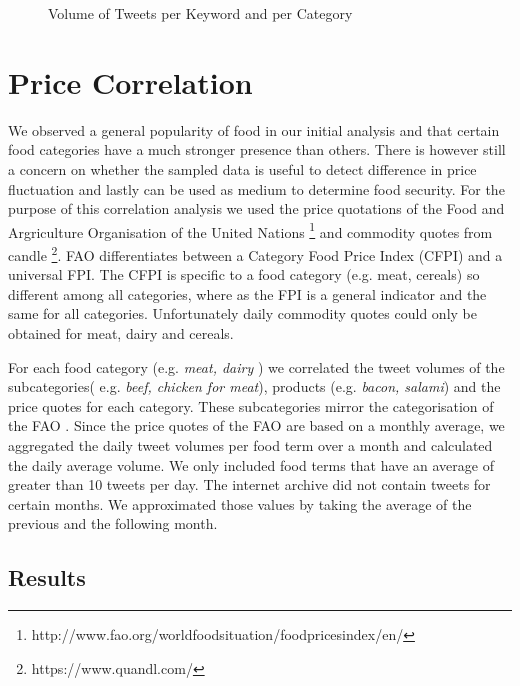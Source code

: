 \begin{figure}[H]
        \caption{Volume of Tweets per Keyword and per Category}\label{fig:distribution}
\end{figure}


\section{Price Correlation}


We observed a general popularity of food in our initial analysis and that certain food categories have a much stronger presence than others. There is however still a concern on whether the sampled data is useful to detect difference in price fluctuation and lastly can  be used as medium to determine food security. For the purpose of this correlation analysis we used the price quotations of the Food and Argriculture Organisation of the United Nations \footnote{http://www.fao.org/worldfoodsituation/foodpricesindex/en/} and commodity quotes from candle \footnote{https://www.quandl.com/}. FAO differentiates between a Category Food Price Index (CFPI) and a universal FPI. The CFPI is specific to a food category (e.g. meat, cereals) so different among all categories, where as the FPI is a general indicator and  the same for all categories. Unfortunately daily commodity quotes could only be obtained for meat, dairy and cereals. 

For each food category (e.g. \emph{meat, dairy} ) we correlated the tweet volumes of the subcategories( e.g. \emph{beef, chicken for meat}), products (e.g. \emph{bacon, salami}) and the price quotes for each category. These subcategories mirror the categorisation of the FAO \cite{fao2008}. Since the price quotes of the FAO are based on a monthly average, we aggregated the daily tweet volumes per food term over a month and calculated the daily average volume. We only included food terms that have an average of greater than 10 tweets per day. The internet archive did not contain tweets for certain months. We approximated those values by taking the average of the previous and the following month. 

\subsection{Results} 
\label{corr_results}

